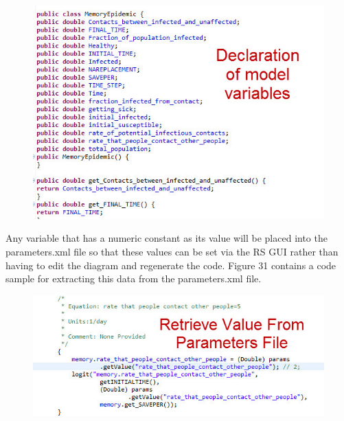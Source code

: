 \documentclass[11pt]{amsart}
\begin{document}
\begin{figure}[ht]
\begin{center}
\vspace{.2in}
\centerline {
\includegraphics[totalheight=0.3\textheight]{images/028.jpg}
}
\caption{}
\label{fig:028}
\end{center}
\end{figure}


Any variable that has a numeric constant as its value will be placed into the parameters.xml file so that these values can be set via the RS GUI rather than having to edit the diagram and regenerate the code. Figure 31 contains a code sample for extracting this data from the parameters.xml file.

\begin{figure}[ht]
\begin{center}
\vspace{.2in}
\centerline {
\includegraphics[totalheight=0.3\textheight]{images/029.jpg}
}
\caption{}
\label{fig:029}
\end{center}
\end{figure}
\end{document}
